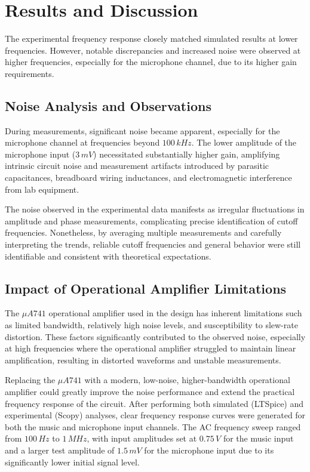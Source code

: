 \documentclass[12pt]{article}
\begin{document}
\section{Results and Discussion}

The experimental frequency response closely matched simulated results at lower frequencies. However, notable discrepancies and increased noise were observed at higher frequencies, especially for the microphone channel, due to its higher gain requirements.

\subsection{Noise Analysis and Observations}

During measurements, significant noise became apparent, especially for the
microphone channel at frequencies beyond $100\,kHz$. The lower amplitude of the
microphone input ($3\,mV$) necessitated substantially higher gain, amplifying intrinsic circuit noise and measurement artifacts introduced by parasitic capacitances, breadboard wiring inductances, and electromagnetic interference from lab equipment.

The noise observed in the experimental data manifests as irregular fluctuations in amplitude and phase measurements, complicating precise identification of cutoff frequencies. Nonetheless, by averaging multiple measurements and carefully interpreting the trends, reliable cutoff frequencies and general behavior were still identifiable and consistent with theoretical expectations.

\subsection{Impact of Operational Amplifier Limitations}

The $\mu A741$ operational amplifier used in the design has inherent limitations such as limited bandwidth, relatively high noise levels, and susceptibility to slew-rate distortion. These factors significantly contributed to the observed noise, especially at high frequencies where the operational amplifier struggled to maintain linear amplification, resulting in distorted waveforms and unstable measurements.

Replacing the $\mu A741$ with a modern, low-noise, higher-bandwidth operational amplifier could greatly improve the noise performance and extend the practical frequency response of the circuit.
After performing both simulated (LTSpice) and experimental (Scopy) analyses,
clear frequency response curves were generated for both the music and microphone
input channels. The AC frequency sweep ranged from $100\,Hz$ to $1\,MHz$, with
input amplitudes set at $0.75\,V$ for the music input and a larger test
amplitude of $1.5\,mV$ for the microphone input due to its significantly lower initial signal level.
\end{document}
